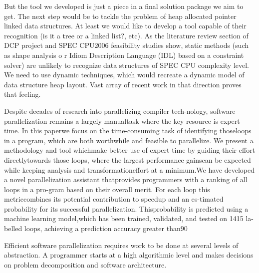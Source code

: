 \documentclass[10pt,a4paper]{report}
\begin{document}
\quad But the tool we developed is just a piece in a final solution package we aim to get. The next step would be to tackle the problem of heap allocated pointer linked data structures. At least we would like to develop a tool capable of their recognition (is it a tree or a linked list?, etc). As the literature review section of DCP project and SPEC CPU2006 feasibility studies show, static methods (such as shape analysis o
r Idiom Description Language (IDL) based on a constraint solver) are unlikely to recognize data structures of SPEC CPU complexity level. We need to use dynamic techniques, which would recreate a dynamic model of data structure heap layout. Vast array of recent work in that direction proves that feeling.




Despite decades of research into parallelizing compiler tech-nology, software parallelization remains a largely manualtask where the key resource is expert time. In this paperwe focus on the time-consuming task of identifying thoseloops in a program, which are both worthwhile and feasible to parallelize. We present a methodology and tool whichmake better use of expert time by guiding their effort directlytowards those loops, where the largest performance gainscan be expected while keeping analysis and transformationeffort at a minimum.We have developed a novel parallelization assistant thatprovides programmers with a ranking of all loops in a pro-gram based on their overall merit. For each loop this metriccombines its potential contribution to speedup and an es-timated probability for its successful parallelization. Thisprobability is predicted using a machine learning model,which has been trained, validated, and tested on 1415 la-belled loops, achieving a prediction accuracy greater than90%


\quad Efficient software parallelization requires work to be done at several levels of abstraction. A programmer starts at a high algorithmic level and makes decisions on problem decomposition and software architecture.       
\end{document}
